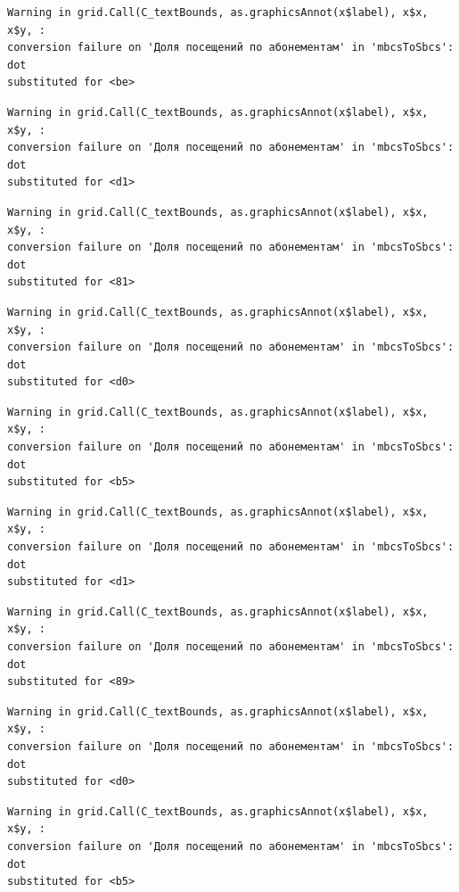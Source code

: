 \documentclass[
  letterpaper,
  DIV=11,
  numbers=noendperiod]{scrartcl}
\begin{document}
\begin{verbatim}
Warning in grid.Call(C_textBounds, as.graphicsAnnot(x$label), x$x, x$y, :
conversion failure on 'Доля посещений по абонементам' in 'mbcsToSbcs': dot
substituted for <be>
\end{verbatim}

\begin{verbatim}
Warning in grid.Call(C_textBounds, as.graphicsAnnot(x$label), x$x, x$y, :
conversion failure on 'Доля посещений по абонементам' in 'mbcsToSbcs': dot
substituted for <d1>
\end{verbatim}

\begin{verbatim}
Warning in grid.Call(C_textBounds, as.graphicsAnnot(x$label), x$x, x$y, :
conversion failure on 'Доля посещений по абонементам' in 'mbcsToSbcs': dot
substituted for <81>
\end{verbatim}

\begin{verbatim}
Warning in grid.Call(C_textBounds, as.graphicsAnnot(x$label), x$x, x$y, :
conversion failure on 'Доля посещений по абонементам' in 'mbcsToSbcs': dot
substituted for <d0>
\end{verbatim}

\begin{verbatim}
Warning in grid.Call(C_textBounds, as.graphicsAnnot(x$label), x$x, x$y, :
conversion failure on 'Доля посещений по абонементам' in 'mbcsToSbcs': dot
substituted for <b5>
\end{verbatim}

\begin{verbatim}
Warning in grid.Call(C_textBounds, as.graphicsAnnot(x$label), x$x, x$y, :
conversion failure on 'Доля посещений по абонементам' in 'mbcsToSbcs': dot
substituted for <d1>
\end{verbatim}

\begin{verbatim}
Warning in grid.Call(C_textBounds, as.graphicsAnnot(x$label), x$x, x$y, :
conversion failure on 'Доля посещений по абонементам' in 'mbcsToSbcs': dot
substituted for <89>
\end{verbatim}

\begin{verbatim}
Warning in grid.Call(C_textBounds, as.graphicsAnnot(x$label), x$x, x$y, :
conversion failure on 'Доля посещений по абонементам' in 'mbcsToSbcs': dot
substituted for <d0>
\end{verbatim}

\begin{verbatim}
Warning in grid.Call(C_textBounds, as.graphicsAnnot(x$label), x$x, x$y, :
conversion failure on 'Доля посещений по абонементам' in 'mbcsToSbcs': dot
substituted for <b5>
\end{verbatim}
\end{document}
